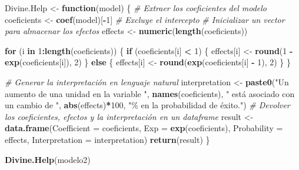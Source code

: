\documentclass[
]{article}
\newenvironment{Shaded}{\begin{snugshade}}{\end{snugshade}}
\newcommand{\AttributeTok}[1]{\textcolor[rgb]{0.13,0.29,0.53}{#1}}
\newcommand{\CommentTok}[1]{\textcolor[rgb]{0.56,0.35,0.01}{\textit{#1}}}
\newcommand{\ControlFlowTok}[1]{\textcolor[rgb]{0.13,0.29,0.53}{\textbf{#1}}}
\newcommand{\DecValTok}[1]{\textcolor[rgb]{0.00,0.00,0.81}{#1}}
\newcommand{\FunctionTok}[1]{\textcolor[rgb]{0.13,0.29,0.53}{\textbf{#1}}}
\newcommand{\NormalTok}[1]{#1}
\newcommand{\OtherTok}[1]{\textcolor[rgb]{0.56,0.35,0.01}{#1}}
\newcommand{\SpecialCharTok}[1]{\textcolor[rgb]{0.81,0.36,0.00}{\textbf{#1}}}
\newcommand{\StringTok}[1]{\textcolor[rgb]{0.31,0.60,0.02}{#1}}
\begin{document}
\begin{Shaded}
\begin{Highlighting}[]
\NormalTok{Divine.Help }\OtherTok{\textless{}{-}} \ControlFlowTok{function}\NormalTok{(model) \{}
   \CommentTok{\# Extraer los coeficientes del modelo}
\NormalTok{  coeficients }\OtherTok{\textless{}{-}} \FunctionTok{coef}\NormalTok{(model)[}\SpecialCharTok{{-}}\DecValTok{1}\NormalTok{] }\CommentTok{\# Excluye el intercepto}
   \CommentTok{\# Inicializar un vector para almacenar los efectos}
\NormalTok{  effects }\OtherTok{\textless{}{-}} \FunctionTok{numeric}\NormalTok{(}\FunctionTok{length}\NormalTok{(coeficients))}
  
  \ControlFlowTok{for}\NormalTok{ (i }\ControlFlowTok{in} \DecValTok{1}\SpecialCharTok{:}\FunctionTok{length}\NormalTok{(coeficients)) \{}
    \ControlFlowTok{if}\NormalTok{ (coeficients[i] }\SpecialCharTok{\textless{}} \DecValTok{1}\NormalTok{) \{}
\NormalTok{      effects[i] }\OtherTok{\textless{}{-}} \FunctionTok{round}\NormalTok{(}\DecValTok{1} \SpecialCharTok{{-}} \FunctionTok{exp}\NormalTok{(coeficients[i]), }\DecValTok{2}\NormalTok{)}
\NormalTok{    \} }\ControlFlowTok{else}\NormalTok{ \{}
\NormalTok{      effects[i] }\OtherTok{\textless{}{-}} \FunctionTok{round}\NormalTok{(}\FunctionTok{exp}\NormalTok{(coeficients[i] }\SpecialCharTok{{-}} \DecValTok{1}\NormalTok{), }\DecValTok{2}\NormalTok{)}
\NormalTok{    \}}
\NormalTok{  \}}
  
   \CommentTok{\# Generar la interpretación en lenguaje natural}
\NormalTok{  interpretation }\OtherTok{\textless{}{-}} \FunctionTok{paste0}\NormalTok{(}\StringTok{"Un aumento de una unidad en la variable "}\NormalTok{, }\FunctionTok{names}\NormalTok{(coeficients),}
                           \StringTok{" está asociado con un cambio de "}\NormalTok{,}
                           \FunctionTok{abs}\NormalTok{(effects)}\SpecialCharTok{*}\DecValTok{100}\NormalTok{, }\StringTok{"\% en la probabilidad de éxito."}\NormalTok{)}
   \CommentTok{\# Devolver los coeficientes, efectos y la interpretación en un dataframe}
\NormalTok{  result }\OtherTok{\textless{}{-}} \FunctionTok{data.frame}\NormalTok{(}\AttributeTok{Coefficient =}\NormalTok{ coeficients,}
                       \AttributeTok{Exp =} \FunctionTok{exp}\NormalTok{(coeficients),}
                       \AttributeTok{Probability =}\NormalTok{ effects,}
                       \AttributeTok{Interpretation =}\NormalTok{ interpretation)}
   \FunctionTok{return}\NormalTok{(result)}
\NormalTok{\}}

\FunctionTok{Divine.Help}\NormalTok{(modelo2)}
\end{Highlighting}
\end{Shaded}
\end{document}
